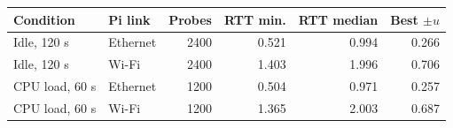 \begin{tabular}{@{}llrrrr@{}}
\toprule
Condition & Pi link & Probes & RTT min. & RTT median & Best $\pm u$ \\
\midrule
Idle, 120 s & Ethernet & 2400 & 0.521 & 0.994 & 0.266 \\
Idle, 120 s & Wi-Fi & 2400 & 1.403 & 1.996 & 0.706 \\
CPU load, 60 s & Ethernet & 1200 & 0.504 & 0.971 & 0.257 \\
CPU load, 60 s & Wi-Fi & 1200 & 1.365 & 2.003 & 0.687 \\
\bottomrule
\end{tabular}
